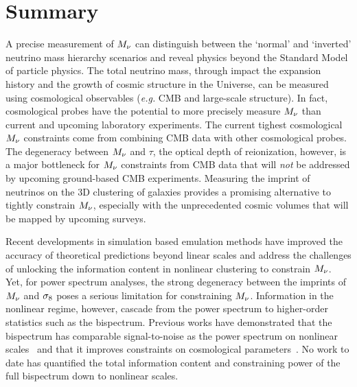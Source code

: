 \section{Summary} 
A precise measurement of $M_\nu$ can distinguish between the `normal' 
and `inverted' neutrino mass hierarchy scenarios and reveal physics 
beyond the Standard Model of particle physics. The total neutrino mass, 
through impact the  expansion history and the growth of cosmic structure 
in the Universe, can be measured using cosmological observables (\emph{e.g.} 
CMB and large-scale structure). In fact, cosmological probes have the 
potential to more precisely measure $M_\nu$ than current and upcoming 
laboratory experiments. The current tighest cosmological $M_\nu$ 
constraints come from combining CMB data with other cosmological probes. 
The degeneracy between $M_\nu$ and $\tau$, the optical depth of reionization, 
however, is a major bottleneck for $M_\nu$ constraints from CMB data 
that will {\em not} be addressed by upcoming ground-based CMB experiments. 
Measuring the imprint of neutrinos on the 3D clustering of galaxies 
provides a promising alternative to tightly constrain $M_\nu$, especially 
with the unprecedented cosmic volumes that will be mapped by upcoming 
surveys. 

Recent developments in simulation based emulation methods have improved 
the accuracy of theoretical predictions beyond linear scales and address 
the challenges of unlocking the information content in nonlinear clustering 
to constrain $M_\nu$. Yet, for power spectrum analyses, the strong 
degeneracy between the imprints of $M_\nu$ and $\sigma_8$ poses a serious 
limitation for constraining $M_\nu$. Information in the nonlinear 
regime, however, cascade from the power spectrum to higher-order statistics 
such as the bispectrum. Previous works have demonstrated that the bispectrum
has comparable signal-to-noise as the power spectrum on nonlinear scales~\citep{sefusatti2005, chan2017}
and that it improves constraints on cosmological parameters~\citep{sefusatti2006, yankelevich2019, chudaykin2019}. 
No work to date has quantified the total information content and constraining 
power of the full bispectrum down to nonlinear scales. 

